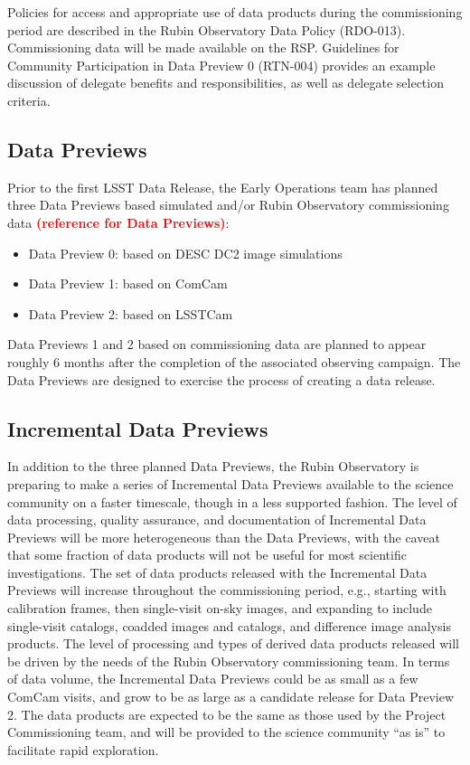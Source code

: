\documentclass[SE,authoryear,toc]{lsstdoc}
\newcommand{\FIXME}[1]{{\bf \textcolor{red}{#1}}}
\begin{document}
Policies for access and appropriate use of data products during the commissioning period are described in the Rubin Observatory Data Policy (RDO-013).
Commissioning data will be made available on the RSP.
Guidelines for Community Participation in Data Preview 0 (RTN-004) provides an example discussion of delegate benefits and responsibilities, as well as delegate selection criteria.

\subsection{Data Previews}

Prior to the first LSST Data Release, the Early Operations team has planned three Data Previews based simulated and/or Rubin Observatory commissioning data \FIXME{(reference for Data Previews)}:

\begin{itemize}
\item Data Preview 0: based on DESC DC2 image simulations
\item Data Preview 1: based on ComCam
\item Data Preview 2: based on LSSTCam
\end{itemize}

Data Previews 1 and 2 based on commissioning data are planned to appear roughly 6 months after the completion of the associated observing campaign. 
The Data Previews are designed to exercise the process of creating a data release. 

\subsection{Incremental Data Previews}

In addition to the three planned Data Previews, the Rubin Observatory is preparing to make a series of Incremental Data Previews available to the science community on a faster timescale, though in a less supported fashion. 
The level of data processing, quality assurance, and documentation of Incremental Data Previews will be more heterogeneous than the Data Previews, with the caveat that some fraction of data products will not be useful for most scientific investigations.
The set of data products released with the Incremental Data Previews will increase throughout the commissioning period, e.g., starting with calibration frames, then single-visit on-sky images, and expanding to include single-visit catalogs, coadded images and catalogs, and difference image analysis products.
The level of processing and types of derived data products released will be driven by the needs of the Rubin Observatory commissioning team.
In terms of data volume, the Incremental Data Previews could be as small as a few ComCam visits, and grow to be as large as a candidate release for Data Preview 2. 
The data products are expected to be the same as those used by the Project Commissioning team, and will be provided to the science community ``as is'' to facilitate rapid exploration.
\end{document}
